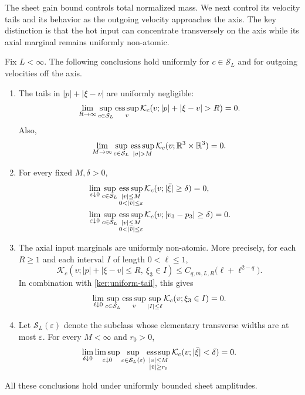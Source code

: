 The sheet gain bound controls total normalized mass. We next control
its velocity tails and its behavior as the outgoing velocity approaches
the axis. The key distinction is that the hot input can concentrate
transversely on the axis while its axial marginal remains uniformly
non-atomic.

\begin{lemma}
\label{lem:kernel-tightness}
Fix $L<\infty$. The following conclusions hold uniformly for
$c\in\mathcal S_L$ and for outgoing velocities off the axis.
\begin{enumerate}[label=\textup{(\roman*)}]
\item The tails in $|p|+|\xi-v|$ are uniformly negligible:
\begin{equation}\label{ker:uniform-tail}
 \lim_{R\to\infty}\sup_{c\in\mathcal S_L}\esssup_v
 \mathcal K_c(v;|p|+|\xi-v|>R)=0.
\end{equation}
Also,
\begin{equation}\label{ker:large-output}
 \lim_{M\to\infty}\sup_{c\in\mathcal S_L}
 \esssup_{|v|>M}\mathcal K_c(v;\R^3\times\R^3)=0.
\end{equation}
\item For every fixed $M,\delta>0$,
\begin{align}
 &\lim_{\varepsilon\downarrow0}
 \sup_{c\in\mathcal S_L}
 \esssup_{\substack{|v|\leq M\\0<|\bar v|\leq\varepsilon}}
 \mathcal K_c(v;|\bar\xi|\geq\delta)=0,
 \label{ker:axis-input}\\
 &\lim_{\varepsilon\downarrow0}
 \sup_{c\in\mathcal S_L}
 \esssup_{\substack{|v|\leq M\\0<|\bar v|\leq\varepsilon}}
 \mathcal K_c(v;|v_3-p_3|\geq\delta)=0.
 \label{ker:axis-mismatch}
\end{align}
\item The axial input marginals are uniformly non-atomic. More
precisely, for each $R\geq1$ and each interval $I$ of length
$0<\ell\leq1$,
\begin{equation}\label{ker:axial-interval}
 \mathcal K_c(v;|p|+|\xi-v|\leq R,\ \xi_3\in I)
 \leq C_{q,m,L,R}\bigl(\ell+\ell^{2-q}\bigr).
\end{equation}
In combination with \eqref{ker:uniform-tail}, this gives
\begin{equation}\label{ker:axial-modulus}
 \lim_{\ell\downarrow0}\sup_{c\in\mathcal S_L}\operatorname*{ess\,sup}_v
 \sup_{|I|\leq\ell}\mathcal K_c(v;\xi_3\in I)=0.
\end{equation}
\item Let $\mathcal S_L(\varepsilon)$ denote the subclass whose
elementary transverse widths are at most $\varepsilon$. For every
$M<\infty$ and $r_0>0$,
\begin{equation}\label{ker:off-axis-small-input}
 \lim_{\delta\downarrow0}\limsup_{\varepsilon\downarrow0}
 \sup_{c\in\mathcal S_L(\varepsilon)}
 \operatorname*{ess\,sup}_{\substack{|v|\leq M\\|\bar v|\geq r_0}}
 \mathcal K_c(v;|\bar\xi|<\delta)=0.
\end{equation}
\end{enumerate}
All these conclusions hold under uniformly bounded sheet amplitudes.
\end{lemma}


